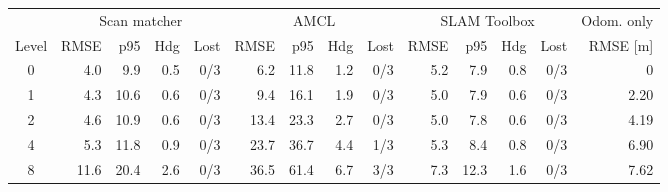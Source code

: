 \begin{tabular}{crrrrrrrrrrrrr}
\toprule
 & \multicolumn{4}{c}{Scan matcher} & \multicolumn{4}{c}{AMCL} & \multicolumn{4}{c}{SLAM Toolbox} & Odom. only \\
\cmidrule(lr){2-5}\cmidrule(lr){6-9}\cmidrule(lr){10-13}\cmidrule(lr){14-14}
Level & RMSE & p95 & Hdg & Lost & RMSE & p95 & Hdg & Lost & RMSE & p95 & Hdg & Lost & RMSE [m] \\
\midrule
0 & 4.0 & 9.9 & 0.5 & 0/3 & 6.2 & 11.8 & 1.2 & 0/3 & 5.2 & 7.9 & 0.8 & 0/3 & 0 \\
1 & 4.3 & 10.6 & 0.6 & 0/3 & 9.4 & 16.1 & 1.9 & 0/3 & 5.0 & 7.9 & 0.6 & 0/3 & 2.20 \\
2 & 4.6 & 10.9 & 0.6 & 0/3 & 13.4 & 23.3 & 2.7 & 0/3 & 5.0 & 7.8 & 0.6 & 0/3 & 4.19 \\
4 & 5.3 & 11.8 & 0.9 & 0/3 & 23.7 & 36.7 & 4.4 & 1/3 & 5.3 & 8.4 & 0.8 & 0/3 & 6.90 \\
8 & 11.6 & 20.4 & 2.6 & 0/3 & 36.5 & 61.4 & 6.7 & 3/3 & 7.3 & 12.3 & 1.6 & 0/3 & 7.62 \\
\bottomrule
\end{tabular}
